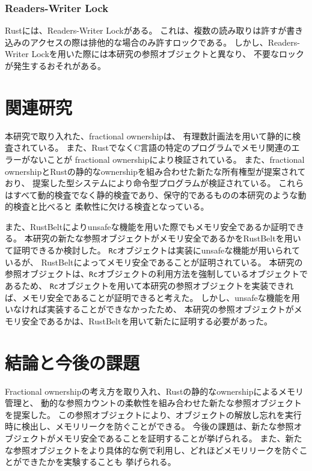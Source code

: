 \documentclass{sumiilab-paper}
\theoremstyle{mystyle}
\numberwithin{definition}{chapter} %
\begin{document}
\subsection{Readers-Writer Lock}
Rustには、Readers-Writer Lock\cite{DBLP:journals/cacm/CouroisHP71}がある。
これは、複数の読み取りは許すが書き込みのアクセスの際は排他的な場合のみ許すロックである。
しかし、Readers-Writer Lockを用いた際には本研究の参照オブジェクトと異なり、
不要なロックが発生するおそれがある。

\chapter{関連研究}
本研究で取り入れた、fractional ownership\cite{DBLP:conf/sas/Boyland03}は、
有理数計画法を用いて静的に検査されている。
また、RustでなくC言語の特定のプログラムでメモリ関連のエラーがないことが
fractional ownershipにより検証されている\cite{10.1007/978-3-642-10672-9_11}。
また、fractional ownershipとRustの静的なownershipを組み合わせた新たな所有権型が提案されており、
提案した型システムにより命令型プログラムが検証されている\cite{10.1007/978-3-031-50521-8_11}。
これらはすべて動的検査でなく静的検査であり、保守的であるものの本研究のような動的検査と比べると
柔軟性に欠ける検査となっている。

また、RustBelt\cite{DBLP:journals/pacmpl/0002JKD18}によりunsafeな機能を用いた際でもメモリ安全であるか証明できる。
本研究の新たな参照オブジェクトがメモリ安全であるかをRustBeltを用いて証明できるか検討した。
\texttt{Rc}オブジェクトは実装にunsafeな機能が用いられているが、
RustBeltによってメモリ安全であることが証明されている。
本研究の参照オブジェクトは、\texttt{Rc}オブジェクトの利用方法を強制しているオブジェクトであるため、
\texttt{Rc}オブジェクトを用いて本研究の参照オブジェクトを実装できれば、メモリ安全であることが証明できると考えた。
しかし、unsafeな機能を用いなければ実装することができなかったため、
本研究の参照オブジェクトがメモリ安全であるかは、RustBeltを用いて新たに証明する必要があった。

\chapter{結論と今後の課題}
Fractional ownershipの考え方を取り入れ、Rustの静的なownershipによるメモリ管理と、
動的な参照カウントの柔軟性を組み合わせた新たな参照オブジェクトを提案した。
この参照オブジェクトにより、オブジェクトの解放し忘れを実行時に検出し、メモリリークを防ぐことができる。
今後の課題は、新たな参照オブジェクトがメモリ安全であることを証明することが挙げられる。
また、新たな参照オブジェクトをより具体的な例で利用し、どれほどメモリリークを防ぐことができたかを実験することも
挙げられる。

\backmatter%



\end{document}
